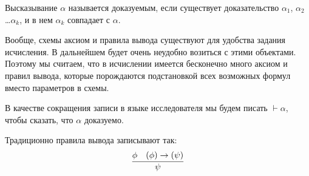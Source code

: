 \begin{definition} Высказывание $\alpha$ называется доказуемым, если 
существует доказательство $\alpha_1$, $\alpha_2$ \dots $\alpha_k$, и в нем
$\alpha_k$ совпадает с $\alpha$. 
\end{definition}

Вообще, схемы аксиом и правила вывода существуют для удобства задания
исчисления. В дальнейшем будет очень неудобно возиться с этими объектами.
Поэтому мы считаем, что в исчислении имеется бесконечно много аксиом и правил вывода,
которые порождаются подстановкой всех возможных формул вместо параметров в схемы.

В качестве сокращения записи в языке исследователя мы будем писать $\vdash \alpha$,
чтобы сказать, что $\alpha$ доказуемо.

Традиционно правила вывода записывают так:
$$\infer{\psi}{\phi & (\phi) \rightarrow (\psi)}$$
